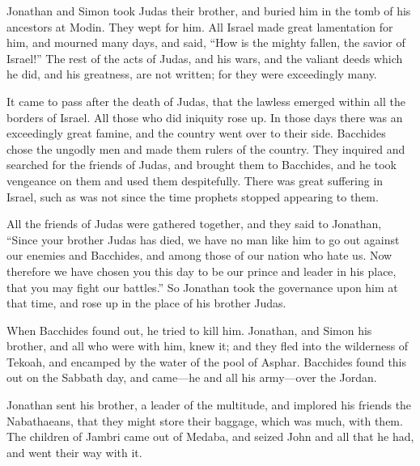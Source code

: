  Jonathan and Simon took Judas their brother, and buried
him in the tomb of his ancestors at Modin.  They wept for
him. All Israel made great lamentation for him, and mourned many days,
and said,  ``How is the mighty fallen, the savior of
Israel!''  The rest of the acts of Judas, and his wars, and
the valiant deeds which he did, and his greatness, are not written; for
they were exceedingly many.

 It came to pass after the death of Judas, that the lawless
emerged within all the borders of Israel. All those who did iniquity
rose up.  In those days there was an exceedingly great
famine, and the country went over to their side.  Bacchides
chose the ungodly men and made them rulers of the country. 
They inquired and searched for the friends of Judas, and brought them to
Bacchides, and he took vengeance on them and used them despitefully.
 There was great suffering in Israel, such as was not since
the time prophets stopped appearing to them.

 All the friends of Judas were gathered together, and they
said to Jonathan,  ``Since your brother Judas has died, we
have no man like him to go out against our enemies and Bacchides, and
among those of our nation who hate us.  Now therefore we
have chosen you this day to be our prince and leader in his place, that
you may fight our battles.''  So Jonathan took the
governance upon him at that time, and rose up in the place of his
brother Judas.

 When Bacchides found out, he tried to kill him.
 Jonathan, and Simon his brother, and all who were with
him, knew it; and they fled into the wilderness of Tekoah, and encamped
by the water of the pool of Asphar.  Bacchides found this
out on the Sabbath day, and came---he and all his army---over the
Jordan.

 Jonathan sent his brother, a leader of the multitude, and
implored his friends the Nabathaeans, that they might store their
baggage, which was much, with them.  The children of Jambri
came out of Medaba, and seized John and all that he had, and went their
way with it.

